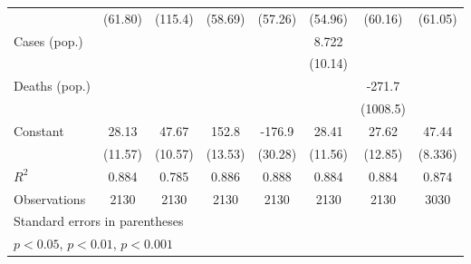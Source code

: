 \documentclass{article}
\begin{document}
{\begin{longtable}{l*{7}{c}}
                &  (61.80)         &  (115.4)         &  (58.69)         &  (57.26)         &  (54.96)         &  (60.16)         &  (61.05)         \\
Cases (pop.)    &                  &                  &                  &                  &    8.722         &                  &                  \\
                &                  &                  &                  &                  &  (10.14)         &                  &                  \\
Deaths (pop.)   &                  &                  &                  &                  &                  &   -271.7         &                  \\
                &                  &                  &                  &                  &                  & (1008.5)         &                  \\
Constant        &    28.13\sym{*}  &    47.67\sym{***}&    152.8\sym{***}&   -176.9\sym{***}&    28.41\sym{*}  &    27.62\sym{*}  &    47.44\sym{***}\\
                &  (11.57)         &  (10.57)         &  (13.53)         &  (30.28)         &  (11.56)         &  (12.85)         &  (8.336)         \\
\hline
\(R^{2}\)       &    0.884         &    0.785         &    0.886         &    0.888         &    0.884         &    0.884         &    0.874         \\
Observations    &     2130         &     2130         &     2130         &     2130         &     2130         &     2130         &     3030         \\
\hline\hline
\multicolumn{8}{l}{\footnotesize Standard errors in parentheses}\\
\multicolumn{8}{l}{\footnotesize \sym{*} \(p<0.05\), \sym{**} \(p<0.01\), \sym{***} \(p<0.001\)}\\
\end{longtable}
}
\end{document}
